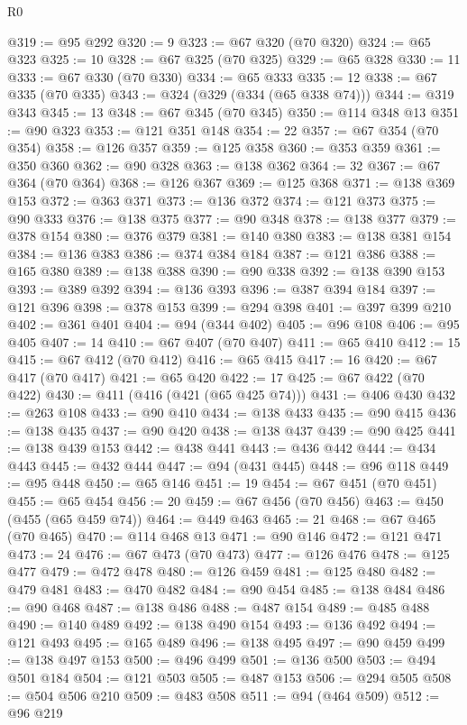 \begin{lexlean}{R0}
\begin{coremodule}
@319 := @95 @292
@320 := 9
@323 := @67 @320 (@70 @320)
@324 := @65 @323
@325 := 10
@328 := @67 @325 (@70 @325)
@329 := @65 @328
@330 := 11
@333 := @67 @330 (@70 @330)
@334 := @65 @333
@335 := 12
@338 := @67 @335 (@70 @335)
@343 := @324 (@329 (@334 (@65 @338 @74)))
@344 := @319 @343
@345 := 13
@348 := @67 @345 (@70 @345)
@350 := @114 @348 @13
@351 := @90 @323
@353 := @121 @351 @148
@354 := 22
@357 := @67 @354 (@70 @354)
@358 := @126 @357
@359 := @125 @358
@360 := @353 @359
@361 := @350 @360
@362 := @90 @328
@363 := @138 @362
@364 := 32
@367 := @67 @364 (@70 @364)
@368 := @126 @367
@369 := @125 @368
@371 := @138 @369 @153
@372 := @363 @371
@373 := @136 @372
@374 := @121 @373
@375 := @90 @333
@376 := @138 @375
@377 := @90 @348
@378 := @138 @377
@379 := @378 @154
@380 := @376 @379
@381 := @140 @380
@383 := @138 @381 @154
@384 := @136 @383
@386 := @374 @384 @184
@387 := @121 @386
@388 := @165 @380
@389 := @138 @388
@390 := @90 @338
@392 := @138 @390 @153
@393 := @389 @392
@394 := @136 @393
@396 := @387 @394 @184
@397 := @121 @396
@398 := @378 @153
@399 := @294 @398
@401 := @397 @399 @210
@402 := @361 @401
@404 := @94 (@344 @402)
@405 := @96 @108
@406 := @95 @405
@407 := 14
@410 := @67 @407 (@70 @407)
@411 := @65 @410
@412 := 15
@415 := @67 @412 (@70 @412)
@416 := @65 @415
@417 := 16
@420 := @67 @417 (@70 @417)
@421 := @65 @420
@422 := 17
@425 := @67 @422 (@70 @422)
@430 := @411 (@416 (@421 (@65 @425 @74)))
@431 := @406 @430
@432 := @263 @108
@433 := @90 @410
@434 := @138 @433
@435 := @90 @415
@436 := @138 @435
@437 := @90 @420
@438 := @138 @437
@439 := @90 @425
@441 := @138 @439 @153
@442 := @438 @441
@443 := @436 @442
@444 := @434 @443
@445 := @432 @444
@447 := @94 (@431 @445)
@448 := @96 @118
@449 := @95 @448
@450 := @65 @146
@451 := 19
@454 := @67 @451 (@70 @451)
@455 := @65 @454
@456 := 20
@459 := @67 @456 (@70 @456)
@463 := @450 (@455 (@65 @459 @74))
@464 := @449 @463
@465 := 21
@468 := @67 @465 (@70 @465)
@470 := @114 @468 @13
@471 := @90 @146
@472 := @121 @471
@473 := 24
@476 := @67 @473 (@70 @473)
@477 := @126 @476
@478 := @125 @477
@479 := @472 @478
@480 := @126 @459
@481 := @125 @480
@482 := @479 @481
@483 := @470 @482
@484 := @90 @454
@485 := @138 @484
@486 := @90 @468
@487 := @138 @486
@488 := @487 @154
@489 := @485 @488
@490 := @140 @489
@492 := @138 @490 @154
@493 := @136 @492
@494 := @121 @493
@495 := @165 @489
@496 := @138 @495
@497 := @90 @459
@499 := @138 @497 @153
@500 := @496 @499
@501 := @136 @500
@503 := @494 @501 @184
@504 := @121 @503
@505 := @487 @153
@506 := @294 @505
@508 := @504 @506 @210
@509 := @483 @508
@511 := @94 (@464 @509)
@512 := @96 @219

\end{coremodule}
\end{lexlean}
